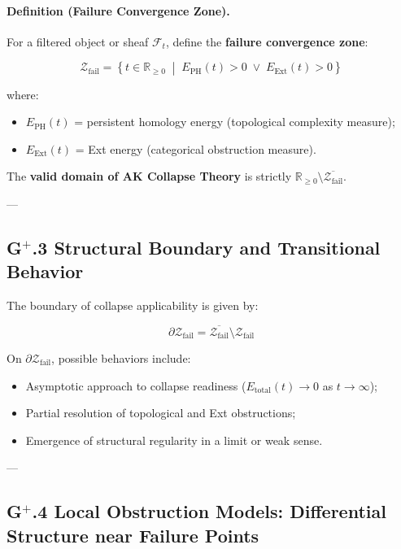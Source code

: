 \documentclass[11pt]{article}
\begin{document}
\paragraph{Definition (Failure Convergence Zone).}

For a filtered object or sheaf $\mathcal{F}_t$, define the \textbf{failure convergence zone}:

\[
\mathcal{Z}_{\mathrm{fail}} = \left\{ t \in \mathbb{R}_{\geq 0} \;\middle|\; E_{\mathrm{PH}}(t) > 0 \;\lor\; E_{\mathrm{Ext}}(t) > 0 \right\}
\]

where:

\begin{itemize}
    \item $E_{\mathrm{PH}}(t)$ = persistent homology energy (topological complexity measure);
    \item $E_{\mathrm{Ext}}(t)$ = Ext energy (categorical obstruction measure).
\end{itemize}

The \textbf{valid domain of AK Collapse Theory} is strictly $\mathbb{R}_{\geq 0} \setminus \overline{\mathcal{Z}_{\mathrm{fail}}}$.

---

\subsection*{G$^{+}$.3 Structural Boundary and Transitional Behavior}

The boundary of collapse applicability is given by:

\[
\partial \mathcal{Z}_{\mathrm{fail}} = \overline{\mathcal{Z}_{\mathrm{fail}}} \setminus \mathcal{Z}_{\mathrm{fail}}
\]

On $\partial \mathcal{Z}_{\mathrm{fail}}$, possible behaviors include:

\begin{itemize}
    \item Asymptotic approach to collapse readiness ($E_{\mathrm{total}}(t) \to 0$ as $t \to \infty$);
    \item Partial resolution of topological and Ext obstructions;
    \item Emergence of structural regularity in a limit or weak sense.
\end{itemize}

---

\subsection*{G$^{+}$.4 Local Obstruction Models: Differential Structure near Failure Points}
\end{document}
